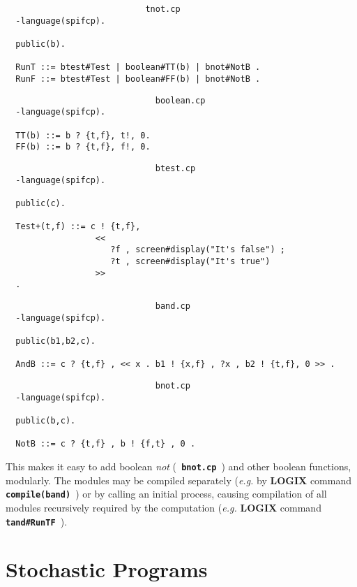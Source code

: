 \documentclass[twoside,10pt]{report}
\begin{document}
\begin{verbatim}
                            tnot.cp
  -language(spifcp).

  public(b).

  RunT ::= btest#Test | boolean#TT(b) | bnot#NotB .
  RunF ::= btest#Test | boolean#FF(b) | bnot#NotB .
\end{verbatim}

\begin{verbatim}
                              boolean.cp
  -language(spifcp).

  TT(b) ::= b ? {t,f}, t!, 0.
  FF(b) ::= b ? {t,f}, f!, 0.
\end{verbatim}

{\samepage
\begin{verbatim}
                              btest.cp
  -language(spifcp).

  public(c).

  Test+(t,f) ::= c ! {t,f},
                  <<
                     ?f , screen#display("It's false") ;
                     ?t , screen#display("It's true")
                  >>
  .
\end{verbatim}
}

\begin{verbatim}
                              band.cp
  -language(spifcp).

  public(b1,b2,c).

  AndB ::= c ? {t,f} , << x . b1 ! {x,f} , ?x , b2 ! {t,f}, 0 >> .
\end{verbatim}

\begin{verbatim}
                              bnot.cp
  -language(spifcp).

  public(b,c).

  NotB ::= c ? {t,f} , b ! {f,t} , 0 .
\end{verbatim}

\noindent
This makes it easy to add boolean {\em not} ({\bf \verb+ bnot.cp +}) and other
boolean functions, modularly.  The modules may be compiled separately
({\em e.g.} by {\bf LOGIX} command {\bf \verb+ compile(band) +}) or by calling
an initial process, causing compilation of all modules recursively
required by the computation 
({\em e.g.} {\bf LOGIX} command {\bf \verb+ tand#RunTF +}).

\chapter{Stochastic Programs}
\label{stochastic}
\end{document}
